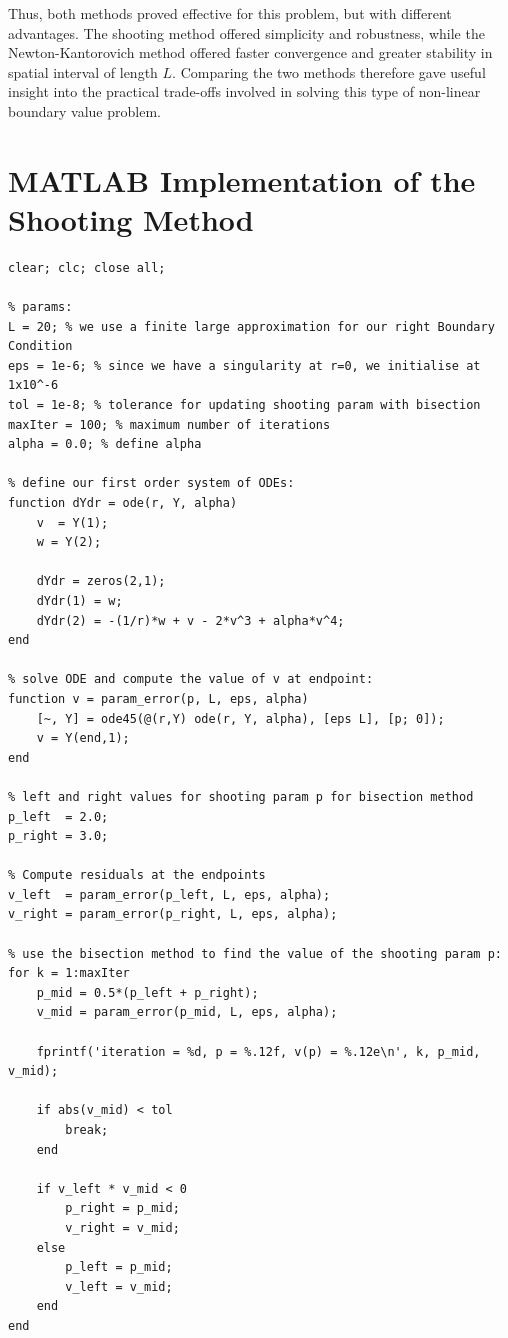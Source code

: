 \documentclass[12pt]{article}
\begin{document}
Thus, both methods proved effective for this problem, but with different advantages. The shooting method offered simplicity and robustness, while the Newton-Kantorovich method offered faster convergence and greater stability in spatial interval of length $L$. Comparing the two methods therefore gave useful insight into the practical trade-offs involved in solving this type of non-linear boundary value problem.

\appendix
\section{MATLAB Implementation of the Shooting Method}
\begin{lstlisting}[caption={MATLAB implementation of the shooting method with bisection update for the parameter \(p\).}, label={lst:shooting}]
clear; clc; close all;

% params: 
L = 20; % we use a finite large approximation for our right Boundary Condition
eps = 1e-6; % since we have a singularity at r=0, we initialise at 1x10^-6
tol = 1e-8; % tolerance for updating shooting param with bisection
maxIter = 100; % maximum number of iterations
alpha = 0.0; % define alpha

% define our first order system of ODEs: 
function dYdr = ode(r, Y, alpha)
    v  = Y(1); 
    w = Y(2);

    dYdr = zeros(2,1);
    dYdr(1) = w;
    dYdr(2) = -(1/r)*w + v - 2*v^3 + alpha*v^4;
end

% solve ODE and compute the value of v at endpoint: 
function v = param_error(p, L, eps, alpha)
    [~, Y] = ode45(@(r,Y) ode(r, Y, alpha), [eps L], [p; 0]);
    v = Y(end,1); 
end

% left and right values for shooting param p for bisection method
p_left  = 2.0;
p_right = 3.0;

% Compute residuals at the endpoints
v_left  = param_error(p_left, L, eps, alpha);
v_right = param_error(p_right, L, eps, alpha);

% use the bisection method to find the value of the shooting param p: 
for k = 1:maxIter
    p_mid = 0.5*(p_left + p_right);
    v_mid = param_error(p_mid, L, eps, alpha);

    fprintf('iteration = %d, p = %.12f, v(p) = %.12e\n', k, p_mid, v_mid);

    if abs(v_mid) < tol
        break;
    end

    if v_left * v_mid < 0
        p_right = p_mid;
        v_right = v_mid;
    else
        p_left = p_mid;
        v_left = v_mid;
    end
end


\end{lstlisting}
\end{document}
